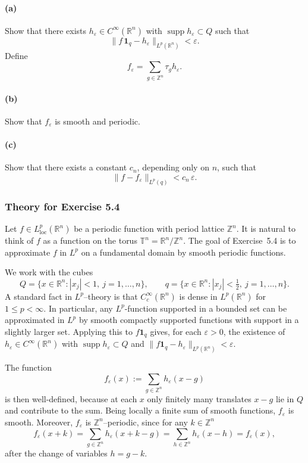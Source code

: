 \documentclass[12pt,a4paper]{article}
\theoremstyle{plain}
\theoremstyle{definition}
\theoremstyle{remark}
\theoremstyle{remark}
\begin{document}
\paragraph{(a)}
Show that there exists $h_\varepsilon \in C^\infty(\mathbb{R}^n)$ with
$\operatorname{supp} h_\varepsilon \subset Q$ such that
\[
\|f\,\mathbf{1}_q - h_\varepsilon\|_{L^p(\mathbb{R}^n)} < \varepsilon.
\]
Define
\[
f_\varepsilon = \sum_{g\in\mathbb{Z}^n} \tau_g h_\varepsilon.
\]

\paragraph{(b)}
Show that $f_\varepsilon$ is smooth and periodic.

\paragraph{(c)}
Show that there exists a constant $c_n$, depending only on $n$, such that
\[
\|f - f_\varepsilon\|_{L^p(q)} < c_n\,\varepsilon.
\]

\subsubsection*{Theory for Exercise 5.4}

Let $f\in L^p_{\mathrm{loc}}(\mathbb{R}^n)$ be a periodic function with
period lattice $\mathbb{Z}^n$.  It is natural to think of $f$ as a
function on the torus $\mathbb{T}^n=\mathbb{R}^n/\mathbb{Z}^n$.  The
goal of Exercise~5.4 is to approximate $f$ in $L^p$ on a fundamental
domain by smooth periodic functions.

We work with the cubes
\[
Q = \{x\in\mathbb{R}^n : |x_j|<1,\ j=1,\dots,n\},
\qquad
q = \{x\in\mathbb{R}^n : |x_j|<\tfrac12,\ j=1,\dots,n\}.
\]
A standard fact in $L^p$--theory is that $C_c^\infty(\mathbb{R}^n)$ is
dense in $L^p(\mathbb{R}^n)$ for $1\le p<\infty$.  In particular, any
$L^p$-function supported in a bounded set can be approximated in $L^p$
by smooth compactly supported functions with support in a slightly
larger set.  Applying this to $f\mathbf{1}_q$ gives, for each
$\varepsilon>0$, the existence of $h_\varepsilon\in C^\infty(\mathbb{R}^n)$
with $\operatorname{supp}h_\varepsilon\subset Q$ and
$\|f\mathbf{1}_q-h_\varepsilon\|_{L^p(\mathbb{R}^n)}<\varepsilon$.

The function
\[
f_\varepsilon(x) := \sum_{g\in\mathbb{Z}^n} h_\varepsilon(x-g)
\]
is then well-defined, because at each $x$ only finitely many translates
$x-g$ lie in $Q$ and contribute to the sum.  Being locally a finite sum
of smooth functions, $f_\varepsilon$ is smooth.  Moreover,
$f_\varepsilon$ is $\mathbb{Z}^n$--periodic, since for any $k\in\mathbb{Z}^n$
\[
f_\varepsilon(x+k)
= \sum_{g\in\mathbb{Z}^n} h_\varepsilon(x+k-g)
= \sum_{h\in\mathbb{Z}^n} h_\varepsilon(x-h)
= f_\varepsilon(x),
\]
after the change of variables $h=g-k$.
\end{document}
